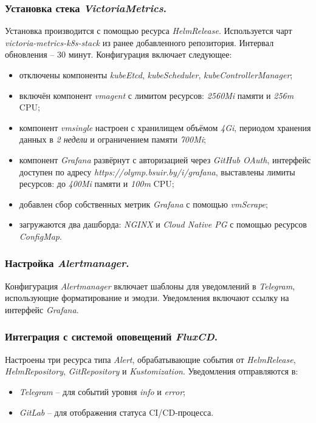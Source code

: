 \subsubsection{Установка стека \textit{VictoriaMetrics}.} Установка производится с помощью ресурса \textit{HelmRelease}. Используется чарт \textit{victoria-metrics-k8s-stack} из ранее добавленного репозитория. Интервал обновления -- 30 минут. Конфигурация включает следующее:

\begin{itemize}
    \item отключены компоненты \textit{kubeEtcd}, \textit{kubeScheduler}, \textit{kubeControllerManager};
    \item включён компонент \textit{vmagent} с лимитом ресурсов: \textit{2560Mi} памяти и \textit{256m} CPU;
    \item компонент \textit{vmsingle} настроен с хранилищем объёмом \textit{4Gi}, периодом хранения данных в \textit{2 недели} и ограничением памяти \textit{700Mi};
    \item компонент \textit{Grafana} развёрнут с авторизацией через \textit{GitHub OAuth}, интерфейс доступен по адресу \textit{https://olymp.bsuir.by/i/grafana}, выставлены лимиты ресурсов: до \textit{400Mi} памяти и \textit{100m} CPU;
    \item добавлен сбор собственных метрик \textit{Grafana} с помощью \textit{vmScrape};
    \item загружаются два дашборда: \textit{NGINX} и \textit{Cloud Native PG} с помощью ресурсов \textit{ConfigMap}.
\end{itemize}

\subsubsection{Настройка \textit{Alertmanager}.} Конфигурация \textit{Alertmanager} включает шаблоны для уведомлений в \textit{Telegram}, использующие форматирование и эмодзи. Уведомления включают ссылку на интерфейс \textit{Grafana}.

\subsubsection{Интеграция с системой оповещений \textit{FluxCD}.} Настроены три ресурса типа \textit{Alert}, обрабатывающие события от \textit{HelmRelease}, \textit{HelmRepository}, \textit{GitRepository} и \textit{Kustomization}. Уведомления отправляются в:

\begin{itemize}
    \item \textit{Telegram} -- для событий уровня \textit{info} и \textit{error};
    \item \textit{GitLab} -- для отображения статуса CI/CD-процесса.
\end{itemize}

